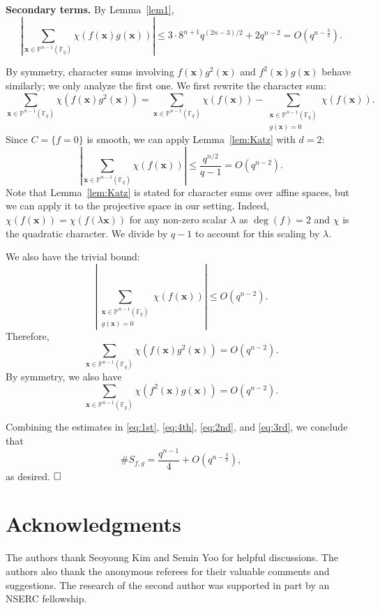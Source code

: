 \documentclass[12pt,reqno]{amsart}
\theoremstyle{definition}
\newcommand{\F}{\mathbb{F}}
\begin{document}
\textbf{Secondary terms.} By Lemma~\ref{lem1},
\begin{equation}\label{eq:4th}
\left|\sum_{\mathbf{x}\in\mathbb{P}^{n-1}(\F_q)}\chi(f(\mathbf{x}) g(\mathbf{x}))\right| \leq 3\cdot 8^{n+1} q^{(2n-3)/2} +2q^{n-2}=O(q^{n-\frac{3}{2}}).    
\end{equation}

By symmetry, character sums involving $f(\mathbf{x}) g^2(\mathbf{x})$ and $f^2(\mathbf{x}) g(\mathbf{x})$ behave similarly; we only analyze the first one. We first rewrite the character sum:
$$
\sum_{\mathbf{x}\in\mathbb{P}^{n-1}(\F_q)} \chi(f(\mathbf{x}) g^2(\mathbf{x})) = 
\sum_{\mathbf{x}\in\mathbb{P}^{n-1}(\F_q)} \chi(f(\mathbf{x})) - \sum_{\substack{\mathbf{x}\in \mathbb{P}^{n-1}(\F_q) \\ g(\mathbf{x})= 0 }} \chi(f(\mathbf{x})).
$$
Since $C=\{f=0\}$ is smooth, we can apply Lemma~\ref{lem:Katz} with $d=2$:
$$
\left|\sum_{\mathbf{x}\in\mathbb{P}^{n-1}(\F_q)} \chi(f(\mathbf{x}))\right| \leq \frac{q^{n/2}}{q-1}=O(q^{n-2}).
$$
Note that  Lemma~\ref{lem:Katz} is stated for character sums over affine spaces, but we can apply it to the projective space in our setting. Indeed, $\chi(f(\mathbf{x}))=\chi(f(\lambda\mathbf{x}))$ for any non-zero scalar $\lambda$ as $\deg(f)=2$ and $\chi$ is the quadratic character. We divide by $q-1$ to account for this scaling by $\lambda$.

We also have the trivial bound:
$$
\left|\sum_{\substack{\mathbf{x}\in \mathbb{P}^{n-1}(\F_q) \\ g(\mathbf{x})= 0 }} \chi(f(\mathbf{x})) \right| \leq O(q^{n-2}).
$$
Therefore,
\begin{equation}\label{eq:2nd}
\sum_{\mathbf{x}\in\mathbb{P}^{n-1}(\F_q)} \chi(f(\mathbf{x}) g^2(\mathbf{x})) = O(q^{n-2}).
\end{equation}
By symmetry, we also have
\begin{equation}\label{eq:3rd}
\sum_{\mathbf{x}\in\mathbb{P}^{n-1}(\F_q)} \chi(f^2(\mathbf{x}) g(\mathbf{x})) = O(q^{n-2}).
\end{equation}

Combining the estimates in \eqref{eq:1st}, \eqref{eq:4th}, \eqref{eq:2nd}, and \eqref{eq:3rd}, we conclude that
$$
\#S_{f, g}= \frac{q^{n-1}}{4} + O(q^{n-\frac{3}{2}}), 
$$
as desired. $\hfill\square$

\section*{Acknowledgments}
The authors thank Seoyoung Kim and Semin Yoo for helpful discussions. The authors also thank the anonymous referees for their valuable comments and suggestions. The research of the second author was supported in part by an NSERC fellowship.



\end{document}
